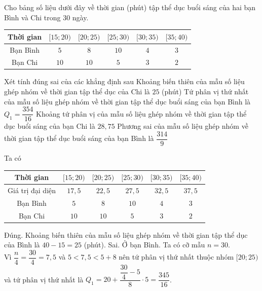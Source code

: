 \begin{ex}%
	Cho bảng số liệu dưới đây về thời gian (phút) tập thể dục buổi sáng của hai bạn Bình và Chi trong $30$ ngày.
	\begin{center}
		\begin{tabular}{|c|c|c|c|c|c|}
			\hline Thời gian & {$[15 ; 20)$} & {$[20 ; 25)$} & {$[25 ; 30)$} & {$[30 ; 35)$} & {$[35 ; 40)$} \\
			\hline Bạn Bình & $5$ & $8$ & $10$ & $4$ & $3$ \\
			\hline Bạn Chi & $10$ & $10$ & $5$ & $3$ & $2$ \\
			\hline
		\end{tabular}
	\end{center}
	Xét tính đúng sai của các khẳng định sau
	\choiceTF
	{Khoảng biến thiên của mẫu số liệu ghép nhóm về thời gian tập thể dục của Chi là $25$ (phút)}
	{Tứ phân vị thứ nhất của mẫu số liệu ghép nhóm về thời gian tập thể dục buổi sáng của bạn Bình là $Q_1=\dfrac{354}{16}$}
	{Khoảng tứ phân vị của mẫu số liệu ghép nhóm về thời gian tập thể dục buổi sáng của bạn Chi là $28,75$}
	{Phương sai của mẫu số liệu ghép nhóm về thời gian tập thể dục buổi sáng của bạn Bình là $\dfrac{314}{9}$}
	\loigiai
	{Ta có
		\begin{center}
			\begin{tabular}{|c|c|c|c|c|c|}
				\hline Thời gian & {$[15 ; 20)$} & {$[20 ; 25)$} & {$[25 ; 30)$} & {$[30 ; 35)$} & {$[35 ; 40)$} \\
				\hline Giá trị đại diện & $17,5$ & $22,5$ & $27,5$ & $32,5$ & $37,5$ \\
				\hline Bạn Bình & $5$ & $8$ & $10$ & $4$ & $3$ \\
				\hline Bạn Chi & $10$ & $10$ & $5$ & $3$ & $2$ \\
				\hline
			\end{tabular}
		\end{center}
		\begin{itemchoice}
			\itemch Đúng. Khoảng biến thiên của mẫu số liệu ghép nhóm về thời gian tập thể dục của Bình là $40-15=25$ (phút).
			\itemch Sai. Ở bạn Bình. Ta có cỡ mẫu $n=30$.\\
			Vì $\dfrac{n}{4}=\dfrac{30}{4}=7,5$ và $5<7,5<5+8$ nên tứ phân vị thứ nhất thuộc nhóm $[20;25)$ và tứ phân vị thứ nhất là $Q_1=20+\dfrac{\dfrac{30}{4}-5}{8} \cdot 5=\dfrac{345}{16}$.

\end{itemchoice}}
\end{ex}
